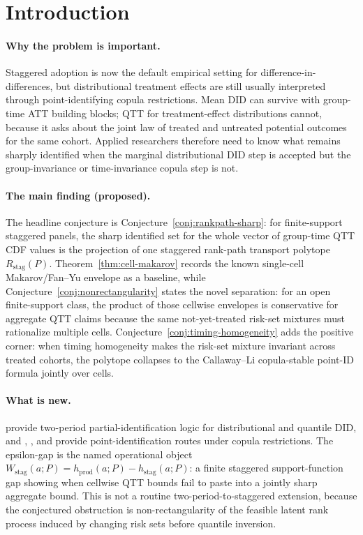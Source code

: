 \documentclass[11pt]{article}
\theoremstyle{definition}
\theoremstyle{plain}
\theoremstyle{remark}
\begin{document}
\section{Introduction}
\paragraph{Why the problem is important.}
Staggered adoption is now the default empirical setting for difference-in-differences, but distributional treatment effects are still usually interpreted through point-identifying copula restrictions.  Mean DID can survive with group-time ATT building blocks; QTT for treatment-effect distributions cannot, because it asks about the joint law of treated and untreated potential outcomes for the same cohort.  Applied researchers therefore need to know what remains sharply identified when the marginal distributional DID step is accepted but the group-invariance or time-invariance copula step is not.

\paragraph{The main finding (proposed).}
The headline conjecture is Conjecture~\ref{conj:rankpath-sharp}: for finite-support staggered panels, the sharp identified set for the whole vector of group-time QTT CDF values is the projection of one staggered rank-path transport polytope \(R_{\mathrm{stag}}(P)\).  Theorem~\ref{thm:cell-makarov} records the known single-cell Makarov/Fan--Yu envelope as a baseline, while Conjecture~\ref{conj:nonrectangularity} states the novel separation: for an open finite-support class, the product of those cellwise envelopes is conservative for aggregate QTT claims because the same not-yet-treated risk-set mixtures must rationalize multiple cells.  Conjecture~\ref{conj:timing-homogeneity} adds the positive corner: when timing homogeneity makes the risk-set mixture invariant across treated cohorts, the polytope collapses to the Callaway--Li copula-stable point-ID formula jointly over cells.

\paragraph{What is new.}
\citet{FanYu2012} provide two-period partial-identification logic for distributional and quantile DID, and \citet{CallawayLiOka2018}, \citet{CallawayLi2019}, and \citet{LiLin2024} provide point-identification routes under copula restrictions.  The epsilon-gap is the named operational object \(W_{\mathrm{stag}}(a;P)=h_{\mathrm{prod}}(a;P)-h_{\mathrm{stag}}(a;P)\): a finite staggered support-function gap showing when cellwise QTT bounds fail to paste into a jointly sharp aggregate bound.  This is not a routine two-period-to-staggered extension, because the conjectured obstruction is non-rectangularity of the feasible latent rank process induced by changing risk sets before quantile inversion.
\end{document}

